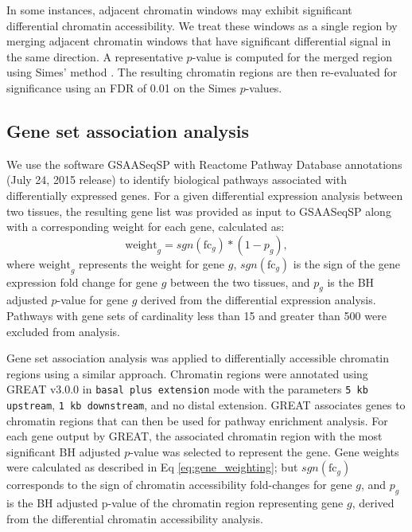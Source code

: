 In some instances, adjacent chromatin windows may exhibit significant differential chromatin accessibility. We treat these windows as a single region by merging adjacent chromatin windows that have significant differential signal in the same direction. A representative $p$-value is computed for the merged region using Simes' method \citep{Sarkar1997}. The resulting chromatin regions are then re-evaluated for significance using an FDR of 0.01 on the Simes $p$-values.

\subsection{Gene set association analysis}

We use the software GSAASeqSP with Reactome Pathway Database annotations (July 24, 2015 release) to identify biological pathways associated with differentially expressed genes. For a given differential expression analysis between two tissues, the resulting gene list was provided as input to GSAASeqSP along with a corresponding weight for each gene, calculated as:
\begin{equation}
\text{weight}_{g} = sgn(\text{fc}_{g}) * (1-p_{g}),
\label{eq:gene_weighting}
\end{equation}
where $\text{weight}_{g}$ represents the weight for gene $g$, $sgn(\text{fc}_{g})$ is the sign of the gene expression fold change for gene $g$ between the two tissues, and $p_{g}$ is the BH adjusted $p$-value for gene $g$ derived from the differential expression analysis. Pathways with gene sets of cardinality less than 15 and greater than 500 were excluded from analysis.

Gene set association analysis was applied to differentially accessible chromatin regions using a similar approach. Chromatin regions were annotated using GREAT v3.0.0 in \texttt{basal plus extension} mode with the parameters \texttt{5 kb upstream}, \texttt{1 kb downstream}, and no distal extension. GREAT associates genes to chromatin regions that can then be used for pathway enrichment analysis. For each gene output by GREAT, the associated chromatin region with the most significant BH adjusted $p$-value was selected to represent the gene. Gene weights were calculated as described in Eq \ref{eq:gene_weighting}; but $sgn(\text{fc}_{g})$ corresponds to the sign of chromatin accessibility fold-changes for gene $g$, and $p_{g}$ is the BH adjusted p-value of the chromatin region representing gene $g$, derived from the differential chromatin accessibility analysis.

